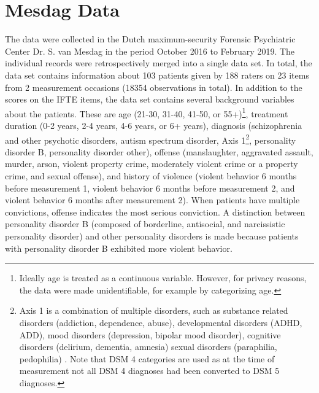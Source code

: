 \documentclass[a4paper,11pt]{article}
\newcommand{\DB}[1]{\todo[inline, color=colorDon,caption={}]{DB: {#1}}}
\begin{document}
\section{Mesdag Data}
The data were collected in the Dutch maximum-security Forensic Psychiatric Center Dr. S. van Mesdag in the period October 2016 to February 2019.
The individual records were retrospectively merged into a single data set. 
In total, the data set contains information about 103 patients given by 188 raters on 23 items from 2 measurement occasions (18354 observations in total).
In addition to the scores on the IFTE items, the data set contains several background variables about the patients.
These are age (21-30, 31-40, 41-50, or 55+)\footnote{Ideally age is treated as a continuous variable. However, for privacy reasons, the data were made unidentifiable, for example by categorizing age.}, treatment duration (0-2 years, 2-4 years, 4-6 years, or 6+ years), diagnosis (schizophrenia and other psychotic disorders, autism spectrum disorder, Axis 1\footnote{Axis 1 is a combination of multiple disorders, such as substance related disorders (addiction, dependence, abuse), developmental disorders (ADHD, ADD),  mood disorders (depression, bipolar mood disorder), cognitive disorders (delirium, dementia, amnesia) sexual disorders (paraphilia, pedophilia) \parencite{segal2010diagnostic}. Note that DSM 4 categories are used as at the time of measurement not all DSM 4 diagnoses had been converted to DSM 5 diagnoses.}, personality disorder B, personality disorder other), offense (manslaughter, aggravated assault, murder, arson, violent property crime, moderately violent crime or a property crime, and sexual offense), and history of violence (violent behavior 6 months before measurement 1, violent behavior 6 months before measurement 2, and violent behavior 6 months after measurement 2). When patients have multiple convictions, offense indicates the most serious conviction. A distinction between personality disorder B (composed of borderline, antisocial, and narcissistic personality disorder) and other personality disorders is made because patients with personality disorder B exhibited more violent behavior.
\end{document}
